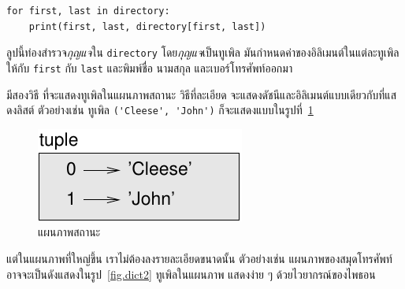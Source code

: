 %
%
\begin{verbatim}
for first, last in directory:
    print(first, last, directory[first, last])
\end{verbatim}
%
ลูปนี้ท่องสำรวจ\textit{กุญแจ}ใน \texttt{directory}
โดย\textit{กุญแจ}เป็นทูเพิล
มันกำหนดค่าของอิลิเมนต์ในแต่ละทูเพิลให้กับ \texttt{first} กับ \texttt{last}
และพิมพ์ชื่อ นามสกุล และเบอร์โทรศัพท์ออกมา


%
มีสองวิธี ที่จะแสดงทูเพิลในแผนภาพสถานะ
วิธีที่ละเอียด จะแสดงดัชนีและอิลิเมนต์แบบเดียวกับที่แสดงลิสต์
ตัวอย่างเช่น ทูเพิล \verb|('Cleese', 'John')|
ก็จะแสดงแบบในรูปที่~\ref{fig.tuple1}
%

\begin{figure}
\centerline
{\includegraphics[scale=0.8]{figs/tuple1.pdf}}
\caption{แผนภาพสถานะ}
\label{fig.tuple1}
\end{figure}

%
แต่ในแผนภาพที่ใหญ่ขึ้น เราไม่ต้องลงรายละเอียดขนาดนั้น
ตัวอย่างเช่น แผนภาพของสมุดโทรศัพท์ อาจจะเป็นดังแสดงในรูป~\ref{fig.dict2}
%
%
ทูเพิลในแผนภาพ แสดงง่าย ๆ ด้วยไวยากรณ์ของไพธอน

